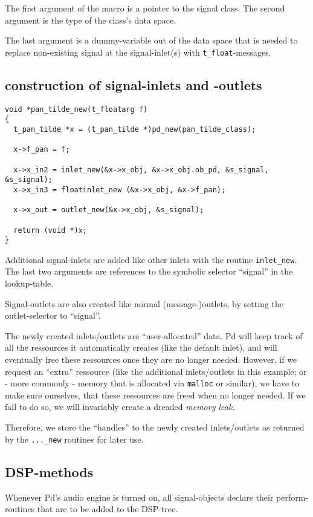 \documentclass[12pt, a4paper,english,titlepage]{article}
\begin{document}
The first argument of the macro is a pointer to the signal class.
The second argument is the type of the class's data space.

The last argument is a dummy-variable out of the data space that is needed
to replace non-existing signal at the signal-inlet(s) with \verb+t_float+-messages.

\subsection{construction of signal-inlets and -outlets}

\begin{verbatim}
void *pan_tilde_new(t_floatarg f)
{
  t_pan_tilde *x = (t_pan_tilde *)pd_new(pan_tilde_class);

  x->f_pan = f;

  x->x_in2 = inlet_new(&x->x_obj, &x->x_obj.ob_pd, &s_signal, &s_signal);
  x->x_in3 = floatinlet_new (&x->x_obj, &x->f_pan);

  x->x_out = outlet_new(&x->x_obj, &s_signal);

  return (void *)x;
}
\end{verbatim}

Additional signal-inlets are added like other inlets with the routine \verb+inlet_new+.
The last two arguments are references to the symbolic selector ``signal''
in the lookup-table.

Signal-outlets are also created like normal (message-)outlets,
by setting the outlet-selector to ``signal''.

The newly created inlets/outlets are ``user-allocated'' data.
Pd will keep track of all the ressources it automatically creates (like the default inlet),
and will eventually free these ressources once they are no longer needed.
However, if we request an ``extra'' ressource (like the additional inlets/outlets in this example;
or - more commonly - memory that is allocated via \verb+malloc+ or similar),
we have to make sure ourselves, that these ressources are freed when no longer needed.
If we fail to do so, we will invariably create a dreaded {\em memory leak}.

Therefore, we store the ``handles'' to the newly created inlets/outlets as returned by the \verb+..._new+ routines
for later use.


\subsection{DSP-methods}
Whenever Pd's audio engine is turned on,
all signal-objects declare their perform-routines that are to be added to the DSP-tree.
\end{document}
